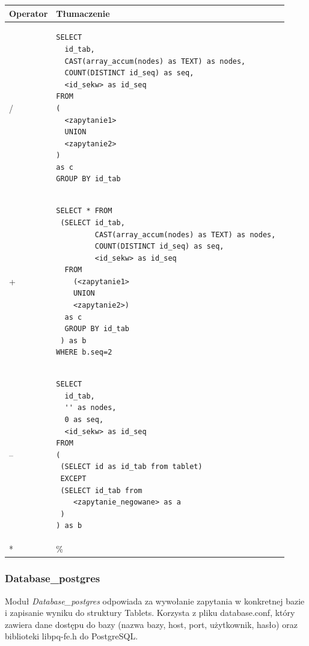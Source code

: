 \begin{longtable}{|p{1in}|p{4.5in}|}
\hline
{\bf Operator} & {\bf Tłumaczenie}\\
\hline
\endhead
/ & 
\begin{verbatim}
SELECT 
  id_tab, 
  CAST(array_accum(nodes) as TEXT) as nodes, 
  COUNT(DISTINCT id_seq) as seq,
  <id_sekw> as id_seq
FROM 
(
  <zapytanie1>
  UNION
  <zapytanie2>
)
as c
GROUP BY id_tab
\end{verbatim}
\\ 
\hline
+ &
\begin{verbatim}
SELECT * FROM
 (SELECT id_tab, 
         CAST(array_accum(nodes) as TEXT) as nodes, 
         COUNT(DISTINCT id_seq) as seq, 
         <id_sekw> as id_seq
  FROM
    (<zapytanie1>
    UNION
    <zapytanie2>)
  as c 
  GROUP BY id_tab
 ) as b
WHERE b.seq=2 
\end{verbatim}
\\ 
\hline
-- & 
\begin{verbatim}
SELECT 
  id_tab, 
  '' as nodes, 
  0 as seq,
  <id_sekw> as id_seq
FROM
(
 (SELECT id as id_tab from tablet)
 EXCEPT
 (SELECT id_tab from
    <zapytanie_negowane> as a
 )   
) as b
\end{verbatim}
\\ 
\hline
* & \%  \\ 
\hline
\end{longtable}


\subsubsection{Database\_postgres}

Moduł \textit{Database\_postgres} odpowiada za wywołanie zapytania w konkretnej bazie i zapisanie wyniku do struktury Tablets.
 Korzysta z pliku database.conf, który zawiera dane dostępu do bazy (nazwa bazy, host, port, użytkownik, hasło)
oraz biblioteki libpq-fe.h do PostgreSQL.
